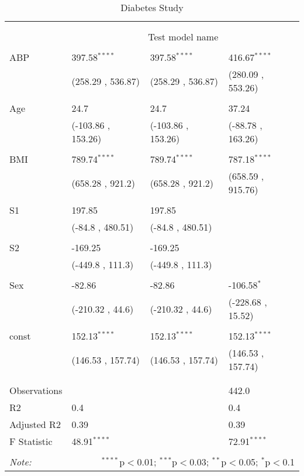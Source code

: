 \begin{table}[!htbp] \centering
  \caption{Diabetes Study}
  \label{}
\begin{tabularx}{\textwidth}{lXXX}
\\[-1.8ex]\hline
\hline \\[-1.8ex]
&\multicolumn{3}{c}{\textit{}} \
\cr \cline{4-4}
\\[-1.8ex]&\multicolumn{3}{c}{Test model name} \\\hline \\[-1.8ex]
 ABP & 397.58$^{****}$ & 397.58$^{****}$ & 416.67$^{****}$ \\
&(258.29 , 536.87)&(258.29 , 536.87)&(280.09 , 553.26)\\
  & & & \\
 Age & 24.7$^{}$ & 24.7$^{}$ & 37.24$^{}$ \\
&(-103.86 , 153.26)&(-103.86 , 153.26)&(-88.78 , 163.26)\\
  & & & \\
 BMI & 789.74$^{****}$ & 789.74$^{****}$ & 787.18$^{****}$ \\
&(658.28 , 921.2)&(658.28 , 921.2)&(658.59 , 915.76)\\
  & & & \\
 S1 & 197.85$^{}$ & 197.85$^{}$ & \\
&(-84.8 , 480.51)&(-84.8 , 480.51)& \\
  & & & \\
 S2 & -169.25$^{}$ & -169.25$^{}$ & \\
&(-449.8 , 111.3)&(-449.8 , 111.3)& \\
  & & & \\
 Sex & -82.86$^{}$ & -82.86$^{}$ & -106.58$^{*}$ \\
&(-210.32 , 44.6)&(-210.32 , 44.6)&(-228.68 , 15.52)\\
  & & & \\
 const & 152.13$^{****}$ & 152.13$^{****}$ & 152.13$^{****}$ \\
&(146.53 , 157.74)&(146.53 , 157.74)&(146.53 , 157.74)\\
  & & & \\
\hline \\[-1.8ex]
 Observations\quad &   &   & 442.0 \\
 R${2}$\quad & 0.4 &   & 0.4 \\
 Adjusted R${2}$\quad & 0.39 &   & 0.39 \\
 F Statistic\quad & 48.91$^{****}$  &     & 72.91$^{****}$  \\
\hline
\hline \\[-1.8ex]
\textit{Note:} & \multicolumn{3}{r}{$^{****}$p$<$0.01; $^{***}$p$<$0.03; $^{**}$p$<$0.05; $^{*}$p$<$0.1} \\
\end{tabularx}
\end{table}